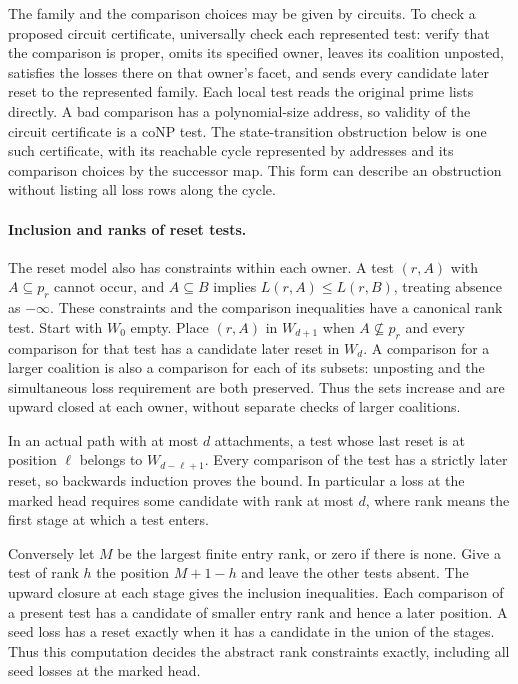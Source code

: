The family and the comparison choices may be
given by circuits. To check a proposed circuit
certificate, universally check each represented
test: verify that the comparison is proper,
omits its specified owner, leaves its coalition
unposted, satisfies the losses there on that
owner's facet, and sends every candidate later
reset to the represented family. Each local
test reads the original prime lists directly.
A bad comparison has a polynomial-size address,
so validity of the circuit certificate is a
coNP test. The state-transition obstruction
below is one such certificate, with its reachable
cycle represented by addresses and its comparison
choices by the successor map. This form can
describe an obstruction without listing all
loss rows along the cycle.

\paragraph{Inclusion and ranks of reset tests.}
The reset model also has constraints within each
owner. A test $(r,A)$ with $A\subseteq p_r$ cannot
occur, and $A\subseteq B$ implies
$L(r,A)\le L(r,B)$, treating absence as $-\infty$.
These constraints and the comparison inequalities
have a canonical rank test. Start with $W_0$ empty.
Place $(r,A)$ in $W_{d+1}$ when $A\not\subseteq p_r$
and every comparison for that test has a
candidate later reset in $W_d$. A comparison
for a larger coalition is also a comparison for
each of its subsets: unposting and the simultaneous
loss requirement are both preserved. Thus the sets
increase and are upward closed at each owner,
without separate checks of larger coalitions.

In an actual path with at most $d$ attachments,
a test whose last reset is at position $\ell$
belongs to $W_{d-\ell+1}$. Every comparison of
the test has a strictly later reset, so backwards
induction proves the bound.
In particular a loss at the marked head requires
some candidate with rank at most $d$, where rank
means the first stage at which a test enters.

Conversely let $M$ be the largest finite entry
rank, or zero if there is none. Give a test of
rank $h$ the position
$M+1-h$ and leave the other tests absent.
The upward closure at each stage gives the
inclusion inequalities. Each comparison of a
present test has a candidate of smaller entry
rank and hence a later position. A seed loss
has a reset exactly when it has a candidate
in the union of the stages. Thus this computation
decides the abstract rank constraints exactly,
including all seed losses at the marked head.

